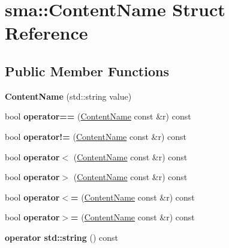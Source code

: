 \hypertarget{structsma_1_1ContentName}{\section{sma\-:\-:Content\-Name Struct Reference}
\label{structsma_1_1ContentName}
}
\subsection*{Public Member Functions}
\begin{DoxyCompactItemize}
\item 
\hypertarget{structsma_1_1ContentName_a8f520f18e5a0130d09c33958da8e7dca}{{\bfseries Content\-Name} (std\-::string value)}\label{structsma_1_1ContentName_a8f520f18e5a0130d09c33958da8e7dca}

\item 
\hypertarget{structsma_1_1ContentName_adfee7b94663265ccf0806931d31a7ce9}{bool {\bfseries operator==} (\hyperlink{structsma_1_1ContentName}{Content\-Name} const \&r) const }\label{structsma_1_1ContentName_adfee7b94663265ccf0806931d31a7ce9}

\item 
\hypertarget{structsma_1_1ContentName_a7ca47e366819a1fbfd7ee2c01a4aff39}{bool {\bfseries operator!=} (\hyperlink{structsma_1_1ContentName}{Content\-Name} const \&r) const }\label{structsma_1_1ContentName_a7ca47e366819a1fbfd7ee2c01a4aff39}

\item 
\hypertarget{structsma_1_1ContentName_ac07dc6f65ebb76d88cb2a789378cd37b}{bool {\bfseries operator$<$} (\hyperlink{structsma_1_1ContentName}{Content\-Name} const \&r) const }\label{structsma_1_1ContentName_ac07dc6f65ebb76d88cb2a789378cd37b}

\item 
\hypertarget{structsma_1_1ContentName_a2b815c3f0a12b7779771befde3a33ac2}{bool {\bfseries operator$>$} (\hyperlink{structsma_1_1ContentName}{Content\-Name} const \&r) const }\label{structsma_1_1ContentName_a2b815c3f0a12b7779771befde3a33ac2}

\item 
\hypertarget{structsma_1_1ContentName_ab277a3ad4e1c372f843c41d40e4d85e2}{bool {\bfseries operator$<$=} (\hyperlink{structsma_1_1ContentName}{Content\-Name} const \&r) const }\label{structsma_1_1ContentName_ab277a3ad4e1c372f843c41d40e4d85e2}

\item 
\hypertarget{structsma_1_1ContentName_a45ec3b085ccebf44c94f252731fdf0f2}{bool {\bfseries operator$>$=} (\hyperlink{structsma_1_1ContentName}{Content\-Name} const \&r) const }\label{structsma_1_1ContentName_a45ec3b085ccebf44c94f252731fdf0f2}

\item 
\hypertarget{structsma_1_1ContentName_a9b5cf4ca0f0aea27209feb257d6bd42a}{{\bfseries operator std\-::string} () const }\label{structsma_1_1ContentName_a9b5cf4ca0f0aea27209feb257d6bd42a}

\end{DoxyCompactItemize}
